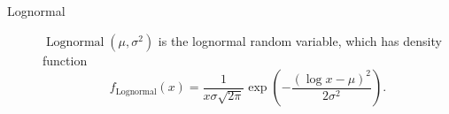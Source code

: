 \documentclass{article}
\DeclareMathOperator{\Lognormal}{Lognormal}
\begin{document}
\begin{description}
\item[Lognormal] $\Lognormal(\mu, \sigma^2)$ is the lognormal random
  variable, which has density function
  \begin{equation}
    f_{\Lognormal}(x) = \frac{1}{x \sigma \sqrt{2 \pi}}
    \exp\left(- \frac{\left(\log x - \mu\right)^2}{2 \sigma^2}\right).
  \end{equation}
\end{description}


\printbibliography
\end{document}
